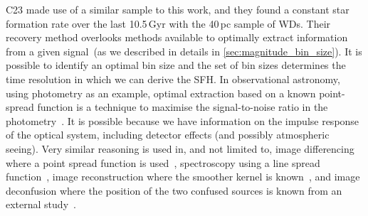\documentclass[fleqn,usenatbib]{mnras}
\begin{document}


C23 made use of a similar sample to this work, and they found a constant
star formation rate over the last 10.5\,Gyr with the 40\,pc sample of WDs.
Their recovery method overlooks methods available to optimally extract
information from a given signal~(as we described in details in
\ref{sec:magnitude_bin_size}). It is possible to identify an optimal bin size
and the set of bin sizes determines the time resolution in which we can derive
the SFH. In observational astronomy, using photometry as an example, optimal
extraction based on a known point-spread function is a technique to maximise
the signal-to-noise ratio in the photometry~\citep{1980SPIE..264..171T, 
1987PASP...99..191S}. It is possible because we have information on the impulse
response of the optical system, including detector effects (and possibly 
atmospheric seeing). Very similar reasoning is used in, and not limited
to, image differencing where a point spread function is
used~\citep{1998ApJ...503..325A, 2008MNRAS.386L..77B, 
2009MNRAS.397.2099A, 2016ApJ...830...27Z}, spectroscopy using a line spread
function~\citep{1986PASP...98..609H, 1989PASP..101.1032M, 2003PASP..115..688K},
image reconstruction where the smoother kernel is
known~\citep{1972JOSA...62...55R, 1974AJ.....79..745L}, and image
deconfusion where the position of the two confused sources is known from an
external study~\citep{2015A&A...582A..15M}.
\end{document}
